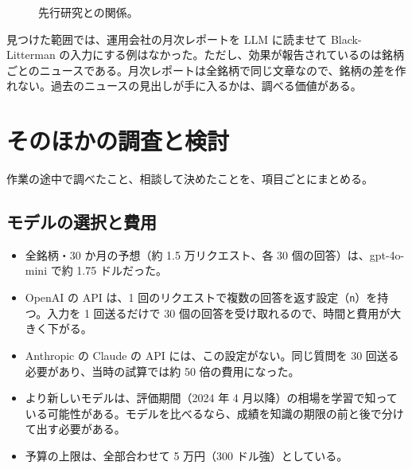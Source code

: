 \documentclass[xelatex,ja=standard,jafont=hiragino-pron,a4paper,10pt]{bxjsreport}
\newcommand{\code}[1]{\texttt{#1}}
\begin{document}
\begin{figure}[htbp]
\centering
{}
\caption{先行研究との関係。}
\end{figure}

見つけた範囲では、運用会社の月次レポートを LLM に読ませて Black-Litterman の入力にする例はなかった。ただし、効果が報告されているのは銘柄ごとのニュースである。月次レポートは全銘柄で同じ文章なので、銘柄の差を作れない。過去のニュースの見出しが手に入るかは、調べる価値がある。

\chapter{そのほかの調査と検討}\label{ch:other}

作業の途中で調べたこと、相談して決めたことを、項目ごとにまとめる。

\section{モデルの選択と費用}

\begin{itemize}
\item 全銘柄・30 か月の予想（約 1.5 万リクエスト、各 30 個の回答）は、gpt-4o-mini で約 1.75 ドルだった。
\item OpenAI の API は、1 回のリクエストで複数の回答を返す設定（\code{n}）を持つ。入力を 1 回送るだけで 30 個の回答を受け取れるので、時間と費用が大きく下がる。
\item Anthropic の Claude の API には、この設定がない。同じ質問を 30 回送る必要があり、当時の試算では約 50 倍の費用になった。
\item より新しいモデルは、評価期間（2024 年 4 月以降）の相場を学習で知っている可能性がある。モデルを比べるなら、成績を知識の期限の前と後で分けて出す必要がある。
\item 予算の上限は、全部合わせて 5 万円（300 ドル強）としている。
\end{itemize}
\end{document}
